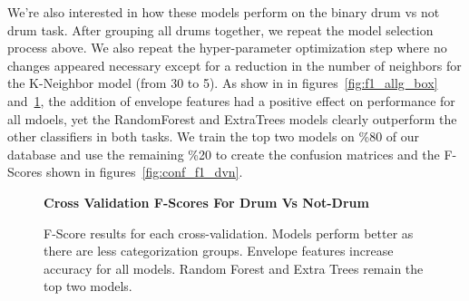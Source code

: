 \documentclass[runningheads,a4paper]{llncs}
\begin{document}
\begin{appendices}
We're also interested in how these models perform on the binary drum vs not drum task.
After grouping all drums together, we repeat the model selection process above. We also repeat the hyper-parameter optimization step where no changes appeared necessary except for a reduction in the number of neighbors for the K-Neighbor model (from 30 to 5). As show in in figures~\ref{fig:f1_allg_box} and~\ref{fig:f1_dvn_box}, the addition of envelope features had a positive effect on performance for all mdoels, yet the RandomForest and ExtraTrees models clearly outperform the other classifiers in both tasks. We train the top two models on \%80 of our database and use the remaining \%20 to create the confusion matrices and the F-Scores shown in figures~\ref{fig:conf_f1_dvn}.
\begin{figure}[h!]   
    \begin{center}
        \textbf{Cross Validation F-Scores For Drum Vs Not-Drum}
    \caption{F-Score results for each cross-validation. Models perform better as there are less categorization groups. Envelope features increase accuracy for all models. Random Forest and Extra Trees remain the top two models. }
    \label{fig:f1_dvn_box}
    \end{center}
\end{figure}



\end{appendices}
\end{document}
